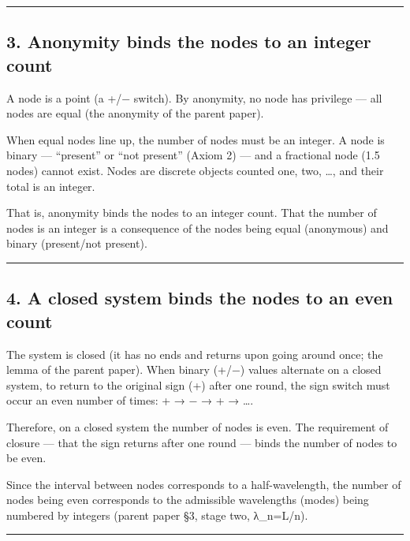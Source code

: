 \documentclass[11pt]{ltjsarticle}
\begin{document}
\begin{center}\rule{0.5\linewidth}{0.5pt}\end{center}

\subsection{3. Anonymity binds the nodes to an integer
count}\label{anonymity-binds-the-nodes-to-an-integer-count}

A node is a point (a +/− switch). By anonymity, no node has privilege
--- all nodes are equal (the anonymity of the parent paper).

When equal nodes line up, the number of nodes must be an integer. A node
is binary --- ``present'' or ``not present'' (Axiom 2) --- and a
fractional node (1.5 nodes) cannot exist. Nodes are discrete objects
counted one, two, \ldots, and their total is an integer.

That is, anonymity binds the nodes to an integer count. That the number
of nodes is an integer is a consequence of the nodes being equal
(anonymous) and binary (present/not present).

\begin{center}\rule{0.5\linewidth}{0.5pt}\end{center}

\subsection{4. A closed system binds the nodes to an even
count}\label{a-closed-system-binds-the-nodes-to-an-even-count}

The system is closed (it has no ends and returns upon going around once;
the lemma of the parent paper). When binary (+/−) values alternate on a
closed system, to return to the original sign (+) after one round, the
sign switch must occur an even number of times: + → − → + → \ldots.

Therefore, on a closed system the number of nodes is even. The
requirement of closure --- that the sign returns after one round ---
binds the number of nodes to be even.

Since the interval between nodes corresponds to a half-wavelength, the
number of nodes being even corresponds to the admissible wavelengths
(modes) being numbered by integers (parent paper §3, stage two,
λ\_n=L/n).

\begin{center}\rule{0.5\linewidth}{0.5pt}\end{center}
\end{document}
